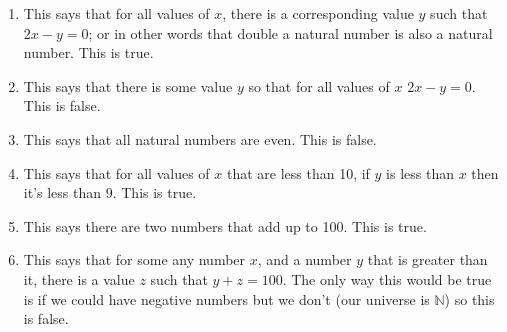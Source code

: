 \documentclass{article}
\begin{document}
\begin{enumerate}
\begin{enumerate}
  \item This says that for all values of $x$, there is a corresponding value $y$ such that $2x - y = 0$; or in other words that double a natural number is also a natural number. This is true.
  \item This says that there is some value $y$ so that for all values of $x$ $2x - y = 0$. This is false.
  \item This says that all natural numbers are even. This is false.
  \item This says that for all values of $x$ that are less than 10, if $y$ is less than $x$ then it's less than $9$.  This is true.
  \item This says there are two numbers that add up to 100. This is true.
  \item This says that for some any number $x$, and a number $y$ that is greater than it, there is a value $z$ such that $y + z = 100$. The only way this would be true is if we could have negative numbers but we don't (our universe is $\mathbb{N}$) so this is false.
  \end{enumerate}
\end{enumerate}
\end{document}
